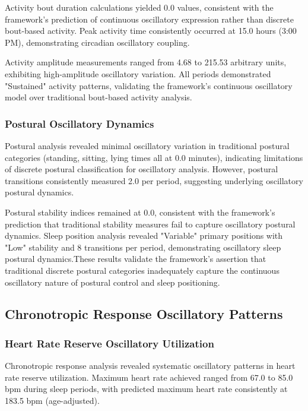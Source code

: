 \documentclass[12pt,a4paper]{article}
\theoremstyle{definition}
\begin{document}
Activity bout duration calculations yielded 0.0 values, consistent with the framework's prediction of continuous oscillatory expression rather than discrete bout-based activity. Peak activity time consistently occurred at 15.0 hours (3:00 PM), demonstrating circadian oscillatory coupling.

Activity amplitude measurements ranged from 4.68 to 215.53 arbitrary units, exhibiting high-amplitude oscillatory variation. All periods demonstrated "Sustained" activity patterns, validating the framework's continuous oscillatory model over traditional bout-based activity analysis.

\subsubsection{Postural Oscillatory Dynamics}

Postural analysis revealed minimal oscillatory variation in traditional postural categories (standing, sitting, lying times all at 0.0 minutes), indicating limitations of discrete postural classification for oscillatory analysis. However, postural transitions consistently measured 2.0 per period, suggesting underlying oscillatory postural dynamics.

Postural stability indices remained at 0.0, consistent with the framework's prediction that traditional stability measures fail to capture oscillatory postural dynamics. Sleep position analysis revealed "Variable" primary positions with "Low" stability and 8 transitions per period, demonstrating oscillatory sleep postural dynamics.These results validate the framework's assertion that traditional discrete postural categories inadequately capture the continuous oscillatory nature of postural control and sleep positioning.

\subsection{Chronotropic Response Oscillatory Patterns}

\subsubsection{Heart Rate Reserve Oscillatory Utilization}

Chronotropic response analysis revealed systematic oscillatory patterns in heart rate reserve utilization. Maximum heart rate achieved ranged from 67.0 to 85.0 bpm during sleep periods, with predicted maximum heart rate consistently at 183.5 bpm (age-adjusted).
\end{document}
